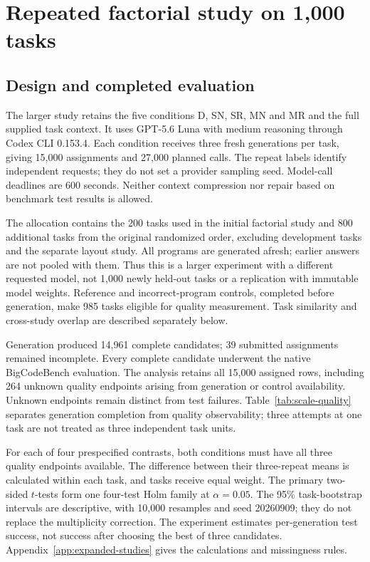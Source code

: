 \section{Repeated factorial study on 1,000 tasks}
\label{sec:scale-results}
\subsection{Design and completed evaluation}
The larger study retains the five conditions D, SN, SR, MN and MR and the full supplied task context. It uses GPT-5.6 Luna with medium reasoning through Codex CLI 0.153.4. Each condition receives three fresh generations per task, giving 15,000 assignments and 27,000 planned calls. The repeat labels identify independent requests; they do not set a provider sampling seed. Model-call deadlines are 600 seconds. Neither context compression nor repair based on benchmark test results is allowed.

The allocation contains the 200 tasks used in the initial factorial study and 800 additional tasks from the original randomized order, excluding development tasks and the separate layout study. All programs are generated afresh; earlier answers are not pooled with them. Thus this is a larger experiment with a different requested model, not 1,000 newly held-out tasks or a replication with immutable model weights. Reference and incorrect-program controls, completed before generation, make 985 tasks eligible for quality measurement. Task similarity and cross-study overlap are described separately below.

Generation produced 14,961 complete candidates; 39 submitted assignments remained incomplete. Every complete candidate underwent the native BigCodeBench evaluation. The analysis retains all 15,000 assigned rows, including 264 unknown quality endpoints arising from generation or control availability. Unknown endpoints remain distinct from test failures. Table~\ref{tab:scale-quality} separates generation completion from quality observability; three attempts at one task are not treated as three independent task units.


For each of four prespecified contrasts, both conditions must have all three quality endpoints available. The difference between their three-repeat means is calculated within each task, and tasks receive equal weight. The primary two-sided $t$-tests form one four-test Holm family at $\alpha=0.05$. The 95\% task-bootstrap intervals are descriptive, with 10,000 resamples and seed 20260909; they do not replace the multiplicity correction. The experiment estimates per-generation test success, not success after choosing the best of three candidates. Appendix~\ref{app:expanded-studies} gives the calculations and missingness rules.

